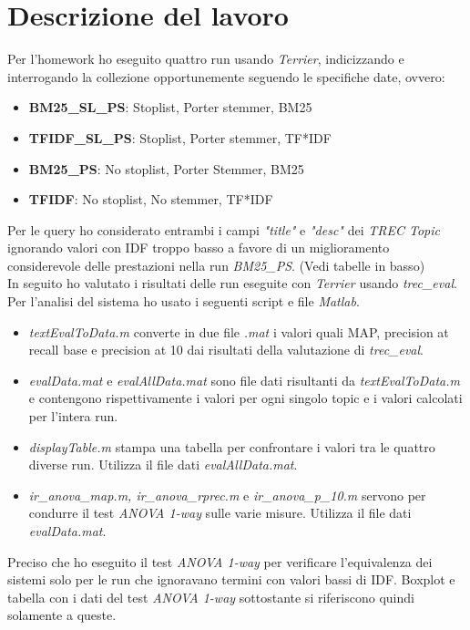 \documentclass[a4paper, 9pt]{article}
\begin{document}
\section*{Descrizione del lavoro}
Per l'homework ho eseguito quattro run usando \textit{Terrier}, indicizzando e interrogando la collezione opportunemente seguendo le specifiche date, ovvero:
\begin{itemize}
    \item \textbf{BM25\_SL\_PS}: Stoplist, Porter stemmer, BM25  
    \item \textbf{TFIDF\_SL\_PS}: Stoplist, Porter stemmer, TF*IDF 
    \item \textbf{BM25\_PS}: No stoplist, Porter Stemmer, BM25 
    \item \textbf{TFIDF}: No stoplist, No stemmer, TF*IDF 
\end{itemize}
Per le query ho considerato entrambi i campi \textit{"title"} e \textit{"desc"} dei \textit{TREC Topic} ignorando valori con IDF troppo basso a favore di un miglioramento considerevole delle prestazioni nella run \textit{BM25\_PS}. (Vedi tabelle in basso)\\
In seguito ho valutato i risultati delle run eseguite con \textit{Terrier} usando \textit{trec\_eval}. \\ 
Per l'analisi del sistema ho usato i seguenti script e file \textit{Matlab}.
\begin{itemize}
\item \textit{textEvalToData.m} converte in due file \textit{.mat} i valori quali MAP, precision at recall base e precision at 10 dai risultati della valutazione di \textit{trec\_eval}.
\item \textit{evalData.mat} e \textit{evalAllData.mat} sono file dati risultanti da \textit{textEvalToData.m} e contengono rispettivamente i valori per ogni singolo topic e i valori calcolati per l'intera run.
\item \textit{displayTable.m} stampa una tabella per confrontare i valori tra le quattro diverse run. Utilizza il file dati \textit{evalAllData.mat}.
\item \textit{ir\_anova\_map.m, ir\_anova\_rprec.m} e \textit{ir\_anova\_p\_10.m} servono per condurre il test \textit{ANOVA 1-way} sulle varie misure. Utilizza il file dati \textit{evalData.mat}.
\end{itemize}
Preciso che ho eseguito il test \textit{ANOVA 1-way} per verificare l'equivalenza dei sistemi solo per le run che ignoravano termini con valori bassi di IDF. Boxplot e tabella con i dati del test \textit{ANOVA 1-way} sottostante si riferiscono quindi solamente a queste.
\newpage
\end{document}
